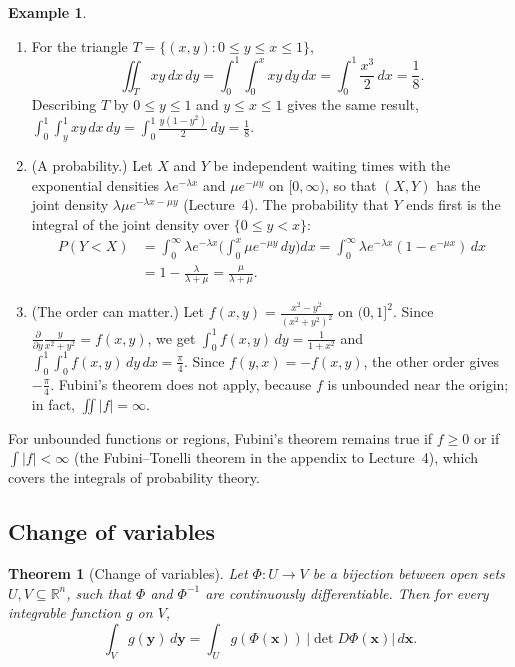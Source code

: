 \documentclass[11pt]{article}
\theoremstyle{definition}
\newtheorem{example}[definition]{Example}
\theoremstyle{plain}
\newtheorem{theorem}[definition]{Theorem}
\theoremstyle{remark}
\begin{document}
\begin{example}\label{ex:fubini}
    \begin{enumerate}
        \item For the triangle $T = \{(x, y) : 0 \leq y \leq x \leq 1\}$,
        \[\iint_T xy\, dx\, dy = \int_0^1 \int_0^x xy\, dy\, dx = \int_0^1 \frac{x^3}{2}\, dx = \frac{1}{8}.\]
        Describing $T$ by $0 \leq y \leq 1$ and $y \leq x \leq 1$ gives the same result, $\int_0^1 \int_y^1 xy\, dx\, dy = \int_0^1 \frac{y(1 - y^2)}{2}\, dy = \frac{1}{8}$.
        \item (A probability.) Let $X$ and $Y$ be independent waiting times with the exponential densities $\lambda e^{-\lambda x}$ and $\mu e^{-\mu y}$ on $[0, \infty)$, so that $(X, Y)$ has the joint density $\lambda\mu e^{-\lambda x - \mu y}$ (Lecture~4). The probability that $Y$ ends first is the integral of the joint density over $\{0 \leq y < x\}$:
        \begin{align*}
            P(Y < X) &= \int_0^\infty \lambda e^{-\lambda x}\bigg(\int_0^x \mu e^{-\mu y}\, dy\bigg) dx = \int_0^\infty \lambda e^{-\lambda x}(1 - e^{-\mu x})\, dx \\
            &= 1 - \frac{\lambda}{\lambda + \mu} = \frac{\mu}{\lambda + \mu}.
        \end{align*}
        \item (The order can matter.) Let $f(x, y) = \frac{x^2 - y^2}{(x^2 + y^2)^2}$ on $(0, 1]^2$. Since $\frac{\partial}{\partial y}\frac{y}{x^2 + y^2} = f(x, y)$, we get $\int_0^1 f(x, y)\, dy = \frac{1}{1 + x^2}$ and $\int_0^1\int_0^1 f(x, y)\, dy\, dx = \frac{\pi}{4}$. Since $f(y, x) = -f(x, y)$, the other order gives $-\frac{\pi}{4}$. Fubini's theorem does not apply, because $f$ is unbounded near the origin; in fact, $\iint |f| = \infty$.
    \end{enumerate}
\end{example}

For unbounded functions or regions, Fubini's theorem remains true if $f \geq 0$ or if $\int |f| < \infty$ (the Fubini--Tonelli theorem in the appendix to Lecture~4), which covers the integrals of probability theory.

\subsection{Change of variables}

\begin{theorem}[Change of variables]\label{thm:change-of-variables}
    Let $\Phi: U \to V$ be a bijection between open sets $U, V \subseteq \mathbb{R}^n$, such that $\Phi$ and $\Phi^{-1}$ are continuously differentiable. Then for every integrable function $g$ on $V$,
    \[\int_V g(\mathbf{y})\, d\mathbf{y} = \int_U g(\Phi(\mathbf{x}))\,|\det D\Phi(\mathbf{x})|\, d\mathbf{x}.\]
\end{theorem}
\end{document}
